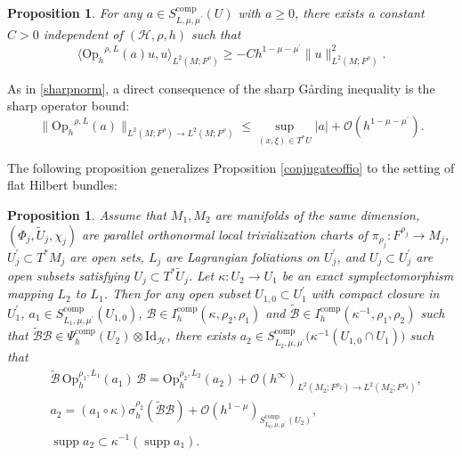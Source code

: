 \documentclass[11pt,oneside,reqno]{amsart}
\newcommand\Oph{\ensuremath{\mathrm{Op}_h}}
\newtheorem{proposition}[theorem]{Proposition}
\theoremstyle{definition}
\numberwithin{equation}{section}
\theoremstyle{plain}
\begin{document}
\begin{proposition}\label{sharpgardingforanisoquant}
For any $a\in S^{\mathrm{comp}}_{L,\mu,\mu^{\prime}}(U)$ with $a\geq 0$, there exists a constant $C>0$ independent of $(\mathcal{H},\rho,h)$ such that  
\begin{equation*}
    \langle \Oph^{\rho,L}(a)u,u\rangle_{L^2(M;F^\rho)} \geq-Ch^{1-\mu-\mu^{\prime}}\|u\|_{L^2(M;F^\rho)}^2.
\end{equation*}
\end{proposition}


As in \eqref{sharpnorm}, a direct consequence of the sharp Gårding inequality is the sharp operator bound:
\begin{equation}\label{sharpnormaniso}
     \|\Oph^{\rho,L}(a) \|_{L^2(M;F^\rho) \to L^2(M;F^\rho) }\leq \sup\limits_{(x,\xi)\in T^*U}|a|+\mathcal{O}(h^{1-\mu-\mu^{\prime}}).
\end{equation}


The following proposition generalizes Proposition \ref{conjugateoffio} to the setting of flat Hilbert bundles:


\begin{proposition}\label{mappingoffio}
Assume that $M_1, M_2$ are manifolds of the same dimension, $(\Phi_j,\widetilde{U}_j,\chi_j)$ are parallel orthonormal local trivialization charts of $\pi_{\rho_j}:F^{\rho_j} \rightarrow M_j$, $U_j^{\prime} \subset T^* M_j$ are open sets, $L_j$ are Lagrangian foliations on $U_j^{\prime}$, and $U_{j}\subset U_{j}^{\prime}$ are open subsets satisfying $U_{j}\subset T^*\widetilde{U}_j$. Let $\kappa: U_2 \rightarrow U_1$ be an exact symplectomorphism mapping $L_2$ to $L_1$. Then for any open subset $U_{1,0} \subset U_{1}^{\prime}$ with compact closure in $U_{1}^{\prime}$, $a_{1} \in S^{\mathrm{comp}}_{L_1,\mu,\mu^{\prime}}(U_{1,0})$, $\mathcal{B}\in I^{\mathrm{comp}}_{h}(\kappa,\rho_2,\rho_{1})$ and $\widetilde{\mathcal{B}} \in I^{\mathrm{comp}}_{h}(\kappa^{-1},\rho_{1},\rho_{2})$ such that $\widetilde{\mathcal{B}}\mathcal{B}\in \Psi^{\mathrm{comp}}_{h}(U_2)\otimes \mathrm{Id}_{\mathcal{H}}$, there exists $a_2 \in S_{L_2, \mu, \mu^{\prime}}^{\mathrm{comp}} \big(\kappa^{-1}(U_{1,0}\cap U_1) \big)$ such that
\begin{equation}
\begin{aligned}
&\widetilde{\mathcal{B}}\,\mathrm{Op}_h^{\rho_1,L_1}(a_1)\,\mathcal{B}  =\mathrm{Op}_h^{\rho_2,L_2}(a_2)+\mathcal{O}(h^{\infty})_{L^2(M_2;F^{\rho_2}) \rightarrow L^2(M_2;F^{\rho_2})} ,\\
&a_2 =(a_1 \circ \kappa ) \sigma_h^{\rho_2}(\widetilde{\mathcal{B}}\mathcal{B})+\mathcal{O}(h^{1-\mu})_{S_{L_0, \mu, \mu^{\prime}}^{\mathrm{comp}}(U_2)} ,\\
&\operatorname{supp} a_2  \subset \kappa^{-1}(\operatorname{supp} a_1).
\end{aligned}
\end{equation}
\end{proposition}
\end{document}
